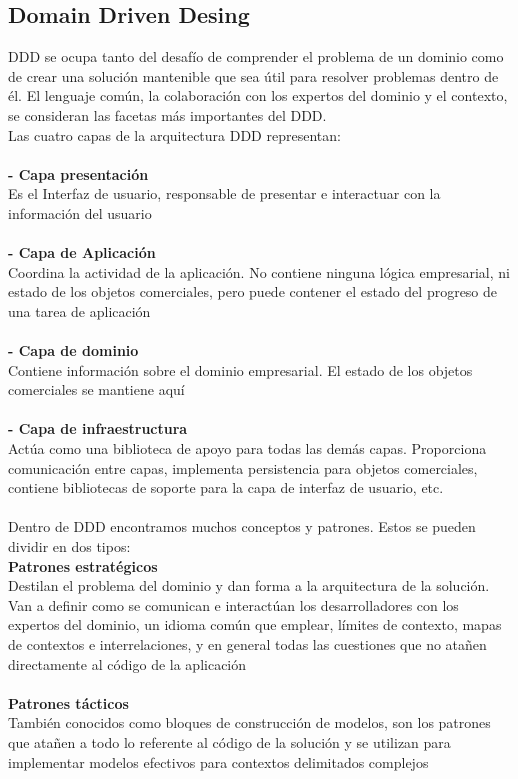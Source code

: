 \documentclass[11pt,letterpaper]{article}
\begin{document}
\subsection{Domain Driven Desing}
DDD se ocupa tanto del desafío de comprender el problema de un dominio como de crear
una solución mantenible que sea útil para resolver problemas dentro de él. El lenguaje
común, la colaboración con los expertos del dominio y el contexto, se consideran las facetas
más importantes del DDD.  \\
Las cuatro capas de la arquitectura DDD representan:\\\\
\textbf{ - Capa presentación } 
\\ Es el Interfaz de usuario, responsable de presentar e interactuar con la
información del usuario\\\\
\textbf{ - Capa de Aplicación } 
\\Coordina la actividad de la aplicación. No contiene ninguna lógica
empresarial, ni estado de los objetos comerciales, pero puede contener el estado del
progreso de una tarea de aplicación\\\\
\textbf{ - Capa de dominio } 
\\ Contiene información sobre el dominio empresarial. El estado de los
objetos comerciales se mantiene aquí \\\\
\textbf{ - Capa de infraestructura } 
\\Actúa como una biblioteca de apoyo para todas las demás capas.
Proporciona comunicación entre capas, implementa persistencia para objetos comerciales,
contiene bibliotecas de soporte para la capa de interfaz de usuario, etc.
\\\\
Dentro de DDD encontramos muchos conceptos y patrones. Estos se pueden dividir en dos
tipos:\\
\textbf{ Patrones estratégicos } 
\\Destilan el problema del dominio y dan forma a la arquitectura de la
solución. Van a definir como se comunican e interactúan los desarrolladores con los
expertos del dominio, un idioma común que emplear, límites de contexto, mapas de
contextos e interrelaciones, y en general todas las cuestiones que no atañen directamente
al código de la aplicación
\\\\
\textbf{ Patrones tácticos } 
\\También conocidos como bloques de construcción de modelos, son los
patrones que atañen a todo lo referente al código de la solución y se utilizan para
implementar modelos efectivos para contextos delimitados complejos
\\\\
\end{document}
